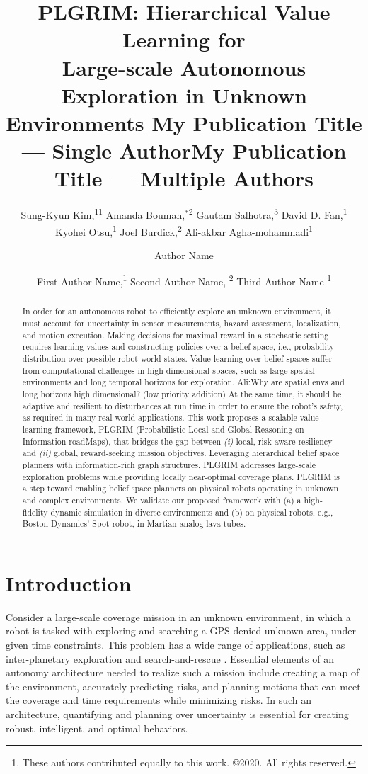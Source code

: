 \documentclass[letterpaper]{article} %
\title{
    PLGRIM: Hierarchical Value Learning for \\Large-scale Autonomous Exploration in Unknown Environments
}
\author{
		Sung-Kyun Kim,\thanks{These authors contributed equally to this work. \newline \hspace*{1.1em} \copyright2020. All rights reserved.}\textsuperscript{\rm 1}
    Amanda Bouman,$^{*}$\textsuperscript{\rm 2}
    Gautam Salhotra,\textsuperscript{\rm 3}
    David D. Fan,\textsuperscript{\rm 1} \\
    Kyohei Otsu,\textsuperscript{\rm 1}
    Joel Burdick,\textsuperscript{\rm 2}
    Ali-akbar Agha-mohammadi\textsuperscript{\rm 1} \\
}
\title{My Publication Title --- Single Author}
\author {
    Author Name \\
}
\title{My Publication Title --- Multiple Authors}
\author {
    First Author Name,\textsuperscript{\rm 1}
    Second Author Name, \textsuperscript{\rm 2}
    Third Author Name \textsuperscript{\rm 1} \\
}
\newcommand{\phdone}[1]{} %
\newcommand{\acomm}[1]{{\color{cyan}Ali:#1}} %
\begin{document}
\maketitle

\begin{abstract}
In order for an autonomous robot to efficiently explore an unknown environment, it must account for uncertainty in sensor measurements, hazard assessment, localization, and motion execution.
Making decisions for maximal reward in a stochastic setting requires learning values and constructing policies over a belief space, i.e., probability distribution over possible robot-world states.
Value learning over belief spaces suffer from computational challenges in high-dimensional spaces, such as large spatial environments and long temporal horizons for exploration. \acomm{Why are spatial envs and long horizons high dimensional? (low priority addition)}
At the same time, it should be adaptive and resilient to disturbances at run time in order to ensure the robot's safety, as required in many real-world applications.
This work proposes a scalable value learning framework, PLGRIM (Probabilistic Local and Global Reasoning on Information roadMaps), that bridges the gap between \textit{(i)} local, risk-aware resiliency and \textit{(ii)} global, reward-seeking mission objectives.  
Leveraging hierarchical belief space planners with information-rich graph structures, PLGRIM addresses large-scale exploration problems while providing locally near-optimal coverage plans. 
PLGRIM is a step toward enabling belief space planners on physical robots operating in unknown and complex environments. 
We validate our proposed framework with (a) a high-fidelity dynamic simulation in diverse environments and (b) on physical robots, e.g., Boston Dynamics' Spot robot, in Martian-analog lava tubes.
\end{abstract}


\section{Introduction}\label{sec:intro}

\phdone{High-level mission}
Consider a large-scale coverage mission in an unknown environment, in which a robot is tasked with exploring and searching a GPS-denied unknown area, under given time constraints. This problem has a wide range of applications, such as inter-planetary exploration and search-and-rescue \cite{blank2020robotic,nagatani2013emergency}. %
Essential elements of an autonomy architecture needed to realize such a mission include creating a map of the environment, accurately predicting risks, and planning motions that can meet the coverage and time requirements while minimizing risks.  In such an architecture, quantifying and planning over uncertainty is essential for creating robust, intelligent, and optimal behaviors.
\end{document}
